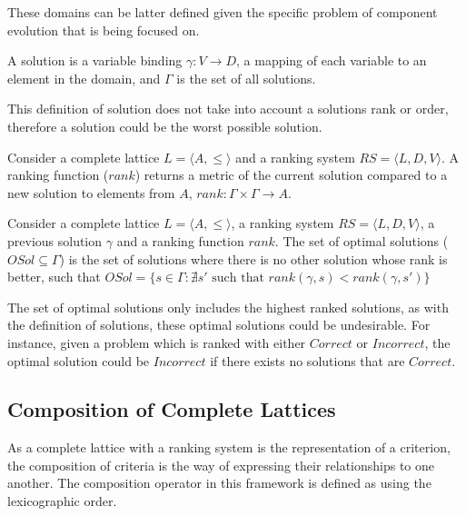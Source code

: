 These domains can be latter defined given the specific problem of component evolution that is being focused on.

\begin{defs}
A solution is a variable binding $\gamma: V \rightarrow D$, a mapping of each variable to an element in the domain,
and $\Gamma$ is the set of all solutions.
\end{defs}

This definition of solution does not take into account a solutions rank or order, therefore a solution could be the worst possible solution.
\begin{defs}
Consider a complete lattice $L = \langle A, \leq \rangle$ and a ranking system $RS = \langle L, D, V \rangle$.
A ranking function ($rank$) returns a metric of the current solution compared to a new solution to elements from $A$,
$rank: \Gamma \times \Gamma \rightarrow A$.
\end{defs}

\begin{defs}
Consider a complete lattice $L = \langle A, \leq \rangle$, a ranking system $RS = \langle L, D, V \rangle$, a previous solution $\gamma$ and a ranking function $rank$.
The set of optimal solutions ($OSol \subseteq \Gamma$) is the set of solutions where there is no other solution whose rank is better,
such that $OSol = \{ s \in \Gamma : \nexists s' \mbox{ such that } rank(\gamma,s) < rank(\gamma,s')\}$
\end{defs}

The set of optimal solutions only includes the highest ranked solutions,
as with the definition of solutions, these optimal solutions could be undesirable.
For instance, given a problem which is ranked with either $Correct$ or $Incorrect$, 
the optimal solution could be $Incorrect$ if there exists no solutions that are $Correct$. 

\subsection{Composition of Complete Lattices}
\label{sec:composition}
As a complete lattice with a ranking system is the representation of a criterion,
the composition of criteria is the way of expressing their relationships to one another. 
The composition operator in this framework is defined as using the lexicographic order.

